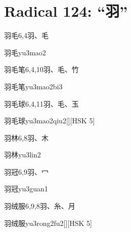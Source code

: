 
\section*{Radical 124: ``⽻''}

\begin{entry}{羽毛}{6,4}{⽻、⽑}
  \begin{phonetics}{羽毛}{yu3mao2}
  \end{phonetics}
\end{entry}

\begin{entry}{羽毛笔}{6,4,10}{⽻、⽑、⽵}
  \begin{phonetics}{羽毛笔}{yu3mao2bi3}
  \end{phonetics}
\end{entry}

\begin{entry}{羽毛球}{6,4,11}{⽻、⽑、⽟}
  \begin{phonetics}{羽毛球}{yu3mao2qiu2}[][HSK 5]
  \end{phonetics}
\end{entry}

\begin{entry}{羽林}{6,8}{⽻、⽊}
  \begin{phonetics}{羽林}{yu3lin2}
  \end{phonetics}
\end{entry}

\begin{entry}{羽冠}{6,9}{⽻、⼍}
  \begin{phonetics}{羽冠}{yu3guan1}
  \end{phonetics}
\end{entry}

\begin{entry}{羽绒服}{6,9,8}{⽻、⽷、⽉}
  \begin{phonetics}{羽绒服}{yu3rong2fu2}[][HSK 5]
  \end{phonetics}
\end{entry}

